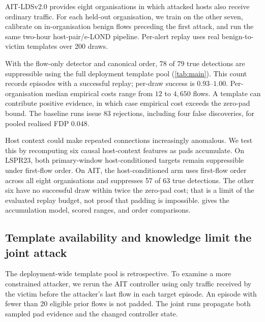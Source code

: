 \documentclass[conference]{IEEEtran}
\begin{document}
AIT-LDSv2.0 provides eight organisations in which attacked hosts also receive ordinary traffic.
For each held-out organisation, we train on the other seven, calibrate on in-organisation benign
flows preceding the first attack, and run the same two-hour host-pair/e-LOND pipeline. Per-alert
replay uses real benign-to-victim templates over 200 draws.

With the flow-only detector and canonical order, 78 of 79 true detections are suppressible using
the full deployment template pool (\cref{tab:main}). This count records episodes with a successful
replay; per-draw success is $0.93$--$1.00$. Per-organisation median empirical costs range from
$12$ to $4{,}650$ flows. A template can contribute positive evidence, in which case empirical
cost exceeds the zero-pad bound. The baseline runs issue 83 rejections, including four false
discoveries, for pooled realised FDP $0.048$.

Host context could make repeated connections increasingly anomalous. We test this by recomputing
six causal host-context features as pads accumulate. On LSPR23, both primary-window host-conditioned
targets remain suppressible under first-flow order. On AIT, the host-conditioned arm uses first-flow
order across all eight organisations and suppresses 57 of 63 true detections. The other six have
no successful draw within twice the zero-pad cost; that is a limit of the evaluated replay budget,
not proof that padding is impossible.  gives the accumulation model, scored ranges,
and order comparisons.

\subsection{Template availability and knowledge limit the joint attack}\label{sec:capability}

The deployment-wide template pool is retrospective. To examine a more constrained attacker, we
rerun the AIT controller using only traffic received by the victim before the attacker's last flow
in each target episode. An episode with fewer than 20 eligible prior flows is not padded.
The joint runs propagate both sampled pad evidence and the changed controller state.
\end{document}
